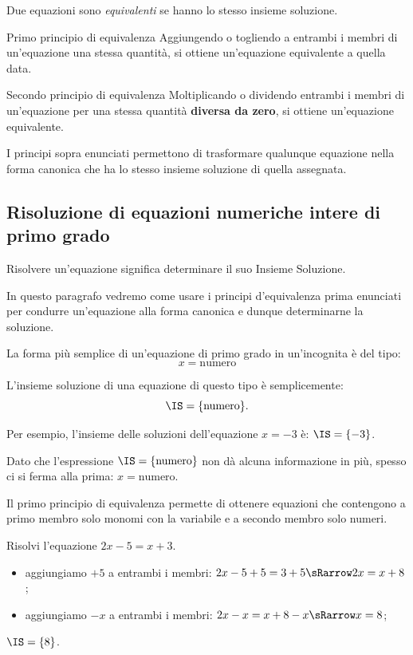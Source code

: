 \begin{definizione}{}{}
Due equazioni sono \emph{equivalenti} se hanno lo stesso insieme soluzione.
\end{definizione}

\begin{teorema}{Primo principio di equivalenza}{}
Aggiungendo o togliendo a entrambi i membri di un'equazione 
una stessa quantità, 
si ottiene un'equazione equivalente a quella data.
\end{teorema}

\begin{teorema}{Secondo principio di equivalenza}{}
Moltiplicando o dividendo entrambi i membri di un'equazione 
per una stessa quantità \textbf{diversa da zero}, 
si ottiene un'equazione equivalente.
\end{teorema}

I principi sopra enunciati permettono di trasformare qualunque equazione
nella forma canonica che ha lo stesso insieme soluzione di quella
assegnata.

\subsection{Risoluzione di equazioni numeriche intere di primo grado}
\begin{definizione}{}{}
Risolvere un'equazione significa determinare il suo Insieme Soluzione.
\end{definizione}

In questo paragrafo vedremo come usare i principi
d'equivalenza prima enunciati per condurre
un'equazione alla forma canonica e dunque determinarne
la soluzione.

La forma più semplice di un'equazione di primo grado in
un'incognita è del tipo:
\[x = \text{numero}\]

L'insieme soluzione di una
equazione di questo tipo è semplicemente:
\[\IS=\{\text{numero}\}.\]

Per esempio, l'insieme delle soluzioni dell'equazione
\(x = -3\) è: \(\IS =\{-3\}\).

Dato che l'espressione \(\IS=\{\text{numero}\}\) non dà alcuna 
informazione in più, 
spesso ci si ferma alla prima: \(x = \text{numero}\).

Il primo principio di equivalenza permette di ottenere equazioni che 
contengono a primo membro solo monomi con la variabile e a secondo membro 
solo numeri. 

\begin{esempio}{}{}
Risolvi l'equazione \(2x -5 = x +3\).

\vspace{.5em}
\begin{itemize}[left=0mm, nosep]
\item aggiungiamo \(+5\) a entrambi i membri:
\(2x -5 +5 = 3 +5 \sRarrow 2x = x +8\);
\item aggiungiamo \(-x\) a entrambi i membri:
\(2x-x=x +8 -x \sRarrow x=8\);
\end{itemize}

\(\IS =\{8\}\).
\end{esempio}

